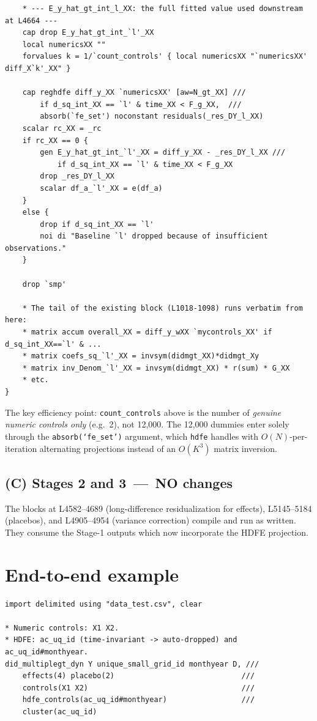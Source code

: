 \documentclass[11pt]{article}
\newcommand{\code}[1]{\texttt{\small #1}}
\newcommand{\1}{\mathbb{1}}
\begin{document}
\begin{lstlisting}
    * --- E_y_hat_gt_int_l_XX: the full fitted value used downstream at L4664 ---
    cap drop E_y_hat_gt_int_`l'_XX
    local numericsXX ""
    forvalues k = 1/`count_controls' { local numericsXX "`numericsXX' diff_X`k'_XX" }

    cap reghdfe diff_y_XX `numericsXX' [aw=N_gt_XX] ///
        if d_sq_int_XX == `l' & time_XX < F_g_XX,  ///
        absorb(`fe_set') noconstant residuals(_res_DY_l_XX)
    scalar rc_XX = _rc
    if rc_XX == 0 {
        gen E_y_hat_gt_int_`l'_XX = diff_y_XX - _res_DY_l_XX ///
            if d_sq_int_XX == `l' & time_XX < F_g_XX
        drop _res_DY_l_XX
        scalar df_a_`l'_XX = e(df_a)
    }
    else {
        drop if d_sq_int_XX == `l'
        noi di "Baseline `l' dropped because of insufficient observations."
    }

    drop `smp'

    * The tail of the existing block (L1018-1098) runs verbatim from here:
    * matrix accum overall_XX = diff_y_wXX `mycontrols_XX' if d_sq_int_XX==`l' & ...
    * matrix coefs_sq_`l'_XX = invsym(didmgt_XX)*didmgt_Xy
    * matrix inv_Denom_`l'_XX = invsym(didmgt_XX) * r(sum) * G_XX
    * etc.
}
\end{lstlisting}

\noindent
The key efficiency point: \code{count\_controls} above is the number of
\emph{genuine numeric controls only} (e.g.\ 2), not 12{,}000. The 12{,}000
dummies enter solely through the \code{absorb(`fe\_set')} argument, which
\code{hdfe} handles with $O(N)$-per-iteration alternating projections
instead of an $O(K^3)$ matrix inversion.

\subsection*{(C) Stages 2 and 3 \,---\, NO changes}

The blocks at L4582--4689 (long-difference residualization for effects),
L5145--5184 (placebos), and L4905--4954 (variance correction) compile and
run as written. They consume the Stage-1 outputs which now incorporate
the HDFE projection.

\section{End-to-end example}

\begin{lstlisting}
import delimited using "data_test.csv", clear

* Numeric controls: X1 X2.
* HDFE: ac_uq_id (time-invariant -> auto-dropped) and ac_uq_id#monthyear.
did_multiplegt_dyn Y unique_small_grid_id monthyear D, ///
    effects(4) placebo(2)                             ///
    controls(X1 X2)                                   ///
    hdfe_controls(ac_uq_id#monthyear)                 ///
    cluster(ac_uq_id)
\end{lstlisting}
\end{document}
